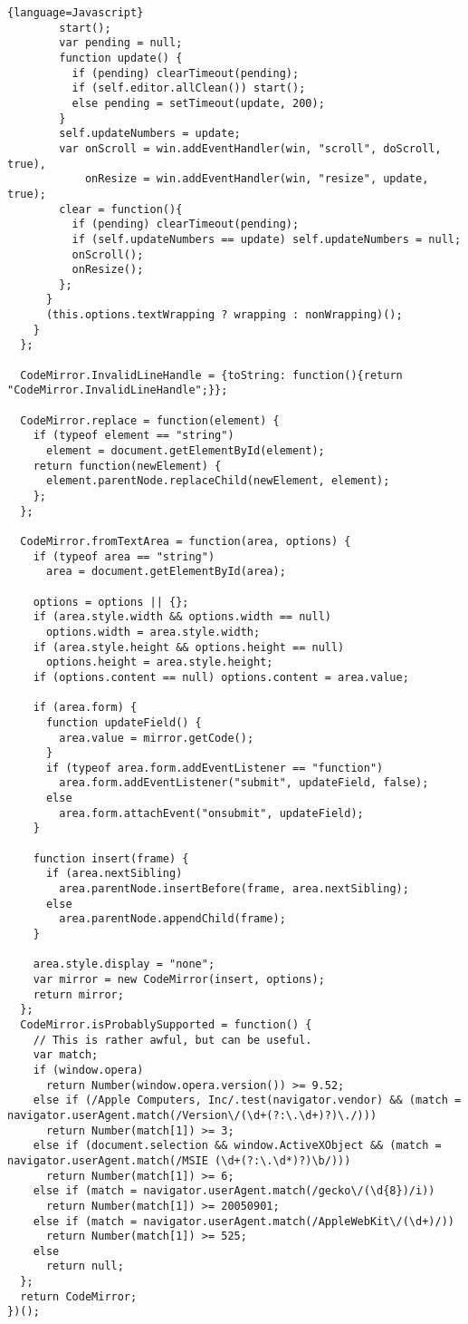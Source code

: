 \begin{lstlisting}{language=Javascript}
        start();
        var pending = null;
        function update() {
          if (pending) clearTimeout(pending);
          if (self.editor.allClean()) start();
          else pending = setTimeout(update, 200);
        }
        self.updateNumbers = update;
        var onScroll = win.addEventHandler(win, "scroll", doScroll, true),
            onResize = win.addEventHandler(win, "resize", update, true);
        clear = function(){
          if (pending) clearTimeout(pending);
          if (self.updateNumbers == update) self.updateNumbers = null;
          onScroll();
          onResize();
        };
      }
      (this.options.textWrapping ? wrapping : nonWrapping)();
    }
  };

  CodeMirror.InvalidLineHandle = {toString: function(){return "CodeMirror.InvalidLineHandle";}};

  CodeMirror.replace = function(element) {
    if (typeof element == "string")
      element = document.getElementById(element);
    return function(newElement) {
      element.parentNode.replaceChild(newElement, element);
    };
  };

  CodeMirror.fromTextArea = function(area, options) {
    if (typeof area == "string")
      area = document.getElementById(area);

    options = options || {};
    if (area.style.width && options.width == null)
      options.width = area.style.width;
    if (area.style.height && options.height == null)
      options.height = area.style.height;
    if (options.content == null) options.content = area.value;

    if (area.form) {
      function updateField() {
        area.value = mirror.getCode();
      }
      if (typeof area.form.addEventListener == "function")
        area.form.addEventListener("submit", updateField, false);
      else
        area.form.attachEvent("onsubmit", updateField);
    }

    function insert(frame) {
      if (area.nextSibling)
        area.parentNode.insertBefore(frame, area.nextSibling);
      else
        area.parentNode.appendChild(frame);
    }

    area.style.display = "none";
    var mirror = new CodeMirror(insert, options);
    return mirror;
  };
  CodeMirror.isProbablySupported = function() {
    // This is rather awful, but can be useful.
    var match;
    if (window.opera)
      return Number(window.opera.version()) >= 9.52;
    else if (/Apple Computers, Inc/.test(navigator.vendor) && (match = navigator.userAgent.match(/Version\/(\d+(?:\.\d+)?)\./)))
      return Number(match[1]) >= 3;
    else if (document.selection && window.ActiveXObject && (match = navigator.userAgent.match(/MSIE (\d+(?:\.\d*)?)\b/)))
      return Number(match[1]) >= 6;
    else if (match = navigator.userAgent.match(/gecko\/(\d{8})/i))
      return Number(match[1]) >= 20050901;
    else if (match = navigator.userAgent.match(/AppleWebKit\/(\d+)/))
      return Number(match[1]) >= 525;
    else
      return null;
  };
  return CodeMirror;
})();
\end{lstlisting}

